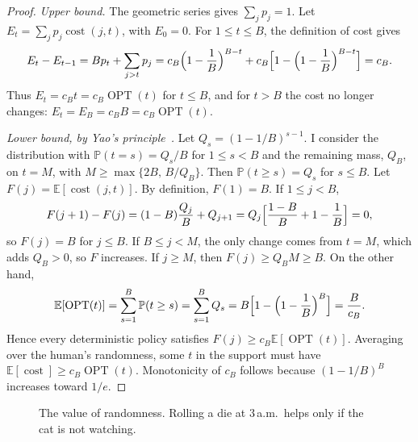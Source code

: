 \documentclass[11pt,a4paper]{article}
\theoremstyle{plain}
\theoremstyle{definition}
\theoremstyle{remark}
\numberwithin{equation}{section}
\newcommand{\E}{\mathbb{E}}
\renewcommand{\P}{\mathbb{P}}
\newcommand{\costo}{\operatorname{cost}}
\newcommand{\OPT}{\operatorname{OPT}}
\begin{document}
\begin{proof}
\emph{Upper bound.} The geometric series gives $\sum_j p_j=1$. Let $E_t=\sum_j p_j\costo(j,t)$, with $E_0=0$. For $1\le t\le B$, the definition of cost gives
\begin{equation}
  E_t-E_{t-1}=Bp_t+\sum_{j>t}p_j=c_B\Bigl(1-\frac1B\Bigr)^{B-t}+c_B\Bigl[1-\Bigl(1-\frac1B\Bigr)^{B-t}\Bigr]=c_B .
\end{equation}
Thus $E_t=c_Bt=c_B\OPT(t)$ for $t\le B$, and for $t>B$ the cost no longer changes: $E_t=E_B=c_BB=c_B\OPT(t)$.

\emph{Lower bound, by Yao's principle~\cite{yao}.} Let $Q_s=(1-1/B)^{s-1}$. I consider the distribution with $\P(t=s)=Q_s/B$ for $1\le s<B$ and the remaining mass, $Q_B$, on $t=M$, with $M\ge\max\{2B,\,B/Q_B\}$. Then $\P(t\ge s)=Q_s$ for $s\le B$. Let $F(j)=\E[\costo(j,t)]$. By definition, $F(1)=B$. If $1\le j<B$,
\begin{equation}
  F(j+1)-F(j)=(1-B)\frac{Q_j}{B}+Q_{j+1}=Q_j\Bigl[\frac{1-B}{B}+1-\frac1B\Bigr]=0,
\end{equation}
so $F(j)=B$ for $j\le B$. If $B\le j<M$, the only change comes from $t=M$, which adds $Q_B>0$, so $F$ increases. If $j\ge M$, then $F(j)\ge Q_BM\ge B$. On the other hand,
\begin{equation}
  \E[\OPT(t)]=\sum_{s=1}^{B}\P(t\ge s)=\sum_{s=1}^{B}Q_s=B\Bigl[1-\Bigl(1-\frac1B\Bigr)^{B}\Bigr]=\frac{B}{c_B}.
\end{equation}
Hence every deterministic policy satisfies $F(j)\ge c_B\E[\OPT(t)]$. Averaging over the human's randomness, some $t$ in the support must have $\E[\costo]\ge c_B\OPT(t)$. Monotonicity of $c_B$ follows because $(1-1/B)^B$ increases toward $1/e$.
\end{proof}

\begin{figure}[ht]
\centering
{}
\caption{The value of randomness. Rolling a die at 3\,a.m.\ helps only if the cat is not watching.}\label{fig:noche}
\end{figure}
\end{document}
